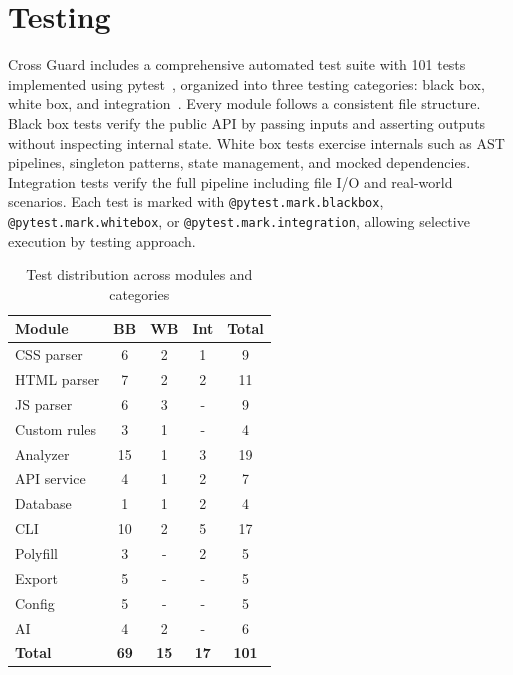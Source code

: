 \section{Testing}
\label{sec:testing}

Cross Guard includes a comprehensive automated test suite with 101 tests implemented using pytest~\cite{pytestdocs}, organized into three testing categories: black box, white box, and integration~\cite{myers2011testing}. Every module follows a consistent file structure. Black box tests verify the public API by passing inputs and asserting outputs without inspecting internal state. White box tests exercise internals such as AST pipelines, singleton patterns, state management, and mocked dependencies. Integration tests verify the full pipeline including file I/O and real-world scenarios. Each test is marked with \texttt{@pytest.mark.blackbox}, \texttt{@pytest.mark.whitebox}, or \texttt{@pytest.mark.integration}, allowing selective execution by testing approach.

\begin{table}[H]
    \centering
    \begin{tabular}{|l|c|c|c|c|}
        \hline
        \textbf{Module} & \textbf{BB} & \textbf{WB} & \textbf{Int} & \textbf{Total} \\
        \hline \hline
        CSS parser    & 6  & 2 & 1 & 9  \\ \hline
        HTML parser   & 7  & 2 & 2 & 11 \\ \hline
        JS parser     & 6  & 3 & - & 9  \\ \hline
        Custom rules  & 3  & 1 & - & 4  \\ \hline
        Analyzer      & 15 & 1 & 3 & 19 \\ \hline
        API service   & 4  & 1 & 2 & 7  \\ \hline
        Database      & 1  & 1 & 2 & 4  \\ \hline
        CLI           & 10  & 2 & 5 & 17 \\ \hline
        Polyfill      & 3  & - & 2 & 5  \\ \hline
        Export        & 5  & - & - & 5  \\ \hline
        Config        & 5  & - & - & 5  \\ \hline
        AI            & 4  & 2 & - & 6  \\ \hline
        \textbf{Total} & \textbf{69} & \textbf{15} & \textbf{17} & \textbf{101} \\ \hline
    \end{tabular}
    \caption{Test distribution across modules and categories}
    \label{tab:test-distribution}
\end{table}

